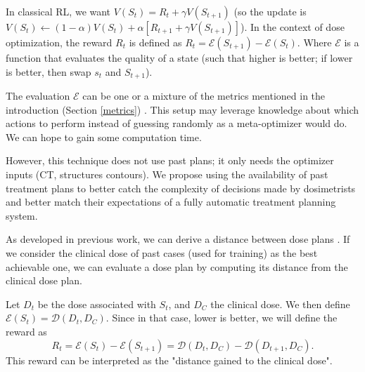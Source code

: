 In classical RL, we want $V(S_t) = R_t + \gamma V(S_{t+1})$
(so the update is $V(S_t) \leftarrow (1-\alpha) V(S_t) + \alpha \left[ R_{t+1} + \gamma V(S_{t+1}) \right]$).
In the context of dose optimization, the reward $R_t$ is defined as $R_t = \mathcal{E}(S_{t+1}) - \mathcal{E}(S_t)$.
Where $\mathcal{E}$ is a function that evaluates the quality of a state (such that higher is better; if lower is better, then swap $s_t$ and $S_{t+1}$).

The evaluation $\mathcal{E}$ can be one or a mixture of the metrics mentioned in the introduction (Section \ref{metrics}) \cite{shen_hierarchical_2021} \cite{shen_intelligent_2019} \cite{moreau_reinforcement_2021}.
This setup may leverage knowledge about which actions to perform instead of guessing randomly as a meta-optimizer would do.
We can hope to gain some computation time.

However, this technique does not use past plans; it only needs the optimizer inputs (CT, structures contours).
We propose using the availability of past treatment plans to better catch the complexity of decisions made by dosimetrists and better match their expectations of a fully automatic treatment planning system.

As developed in previous work, we can derive a distance between dose plans \cite{paul_dubois_novel_2024}.
If we consider the clinical dose of past cases (used for training) as the best achievable one, we can evaluate a dose plan by computing its distance from the clinical dose plan.

Let $D_t$ be the dose associated with $S_t$, and $D_C$ the clinical dose.
We then define $\mathcal{E}(S_t) = \mathcal{D}(D_t, D_C)$.
Since in that case, lower is better, we will define the reward as $$R_t = \mathcal{E}(S_t) - \mathcal{E}(S_{t+1}) = \mathcal{D}(D_t, D_C) - \mathcal{D}(D_{t+1}, D_C).$$
This reward can be interpreted as the "distance gained to the clinical dose".


